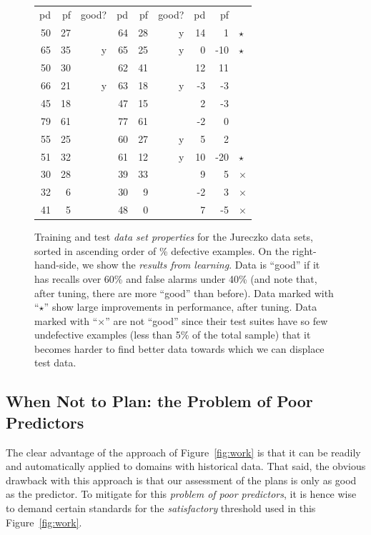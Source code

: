 \documentclass[conference]{IEEEtran}
\newcommand{\fig}[1]{Figure~\ref{fig:#1}}
\begin{document}
\begin{figure}[!t]
\begin{center}
\begin{minipage}{.4\linewidth}
\begin{tabular}{|rrr|rrr|rr|l}
  pd & pf & good? & pd & pf & good? & pd & pf\\\cline{1-8}
  50 & 27 &   & 64 & 28 & y & 14 & 1&$\star$\\
  65 & 35 & y & 65 & 25 & y & 0 & -10&$\star$\\
  50 & 30 &   & 62 & 41 &   & 12 & 11\\
  66 & 21 & y & 63 & 18 & y & -3 & -3\\
  45 & 18 &   & 47 & 15 &   & 2 & -3\\
  79 & 61 &   & 77 & 61 &   & -2 & 0\\
  55 & 25 &   & 60 & 27 & y & 5 & 2\\
  51 & 32 &   & 61 & 12 & y & 10 & -20&$\star$\\
 30 & 28 &   & 39 & 33 &   & 9 & 5&$\times$\\
  32 & 6 &   & 30 & 9 &   & -2 & 3&$\times$\\
  41 & 5 &   & 48 & 0 &   & 7 & -5&$\times$\\
\hline 
\end{tabular}

\end{minipage}
\end{center}    
  
    \caption{Training and test {\em data set properties} for the Jureczko data sets,
    sorted in ascending order of \% defective examples.
    On the right-hand-side, we show the {\em results from learning}.
    Data is ``good'' if it has   recalls over 60\% and false alarms under 40\%
(and note that, after tuning, there are more ``good'' than before).
Data   marked with ``$\star$'' show large improvements in performance, after tuning.
Data   marked with ``$\times$'' are not ``good'' since their test suites  have so few undefective examples (less than 5\% of the total sample) that it becomes harder to find better data towards which we can displace test data.
}\label{fig:j}
\end{figure}


\subsection{When Not to Plan: the Problem of Poor Predictors}

The clear advantage of the approach of \fig{work} is that it can be readily and automatically
applied to domains with historical data. That said, the obvious drawback with this approach
is that our assessment of the plans is only as good as the predictor. To 
mitigate for this {\em problem of poor predictors}, it is hence wise to demand certain standards for the {\em
satisfactory} threshold used in this \fig{work}. 
 
\end{document}
